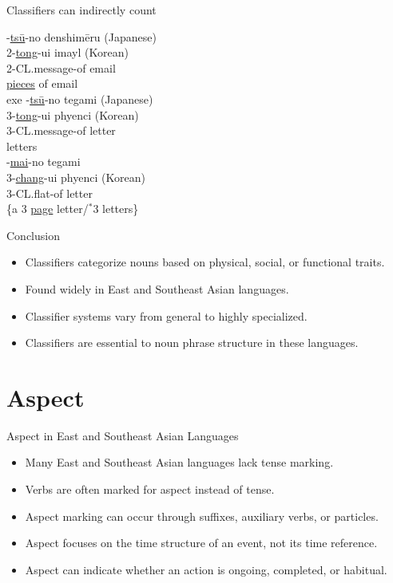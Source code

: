 \documentclass{beamer}
\newcommand{\cll}[1]{\uline{#1}}
\begin{document}
\begin{frame}{Classifiers can indirectly count}
  \begin{exe}
  \ex
  -\cll{ts\=u}-no denshim\=eru (Japanese)\\
        2-\cll{tong}-ui imayl (Korean) \\
        2-CL.message-of email \\
   \cll{pieces} of email\\
 {exe}
  \ex
  -\cll{ts\=u}-no tegami (Japanese)\\
        3-\cll{tong}-ui phyenci (Korean)\\
        3-CL.message-of letter\\
  letters           \\%
\ex
{}-\cll{mai}-no tegami \\
       3-\cll{chang}-ui phyenci (Korean)\\
      3-CL.flat-of letter \\
\trans \{a 3 \cll{page} letter/$^*$3 letters\}  \\%
    \end{exe}
\citep{Bond:1997b}
\end{frame}

\begin{frame}{Conclusion}
\begin{itemize}
    \item Classifiers categorize nouns based on physical, social, or functional traits.
    \item Found widely in East and Southeast Asian languages.
    \item Classifier systems vary from general to highly specialized.
    \item Classifiers are essential to noun phrase structure in these languages.
\end{itemize}
\end{frame}

\section{Aspect}

\begin{frame}{Aspect in East and Southeast Asian Languages}
\begin{itemize}
    \item Many East and Southeast Asian languages lack tense marking.
    \item Verbs are often marked for aspect instead of tense.
    \item Aspect marking can occur through suffixes, auxiliary verbs, or particles.
    \item Aspect focuses on the time structure of an event, not its time reference.
    \item Aspect can indicate whether an action is ongoing, completed, or habitual.
\end{itemize}
\end{frame}
\end{document}
